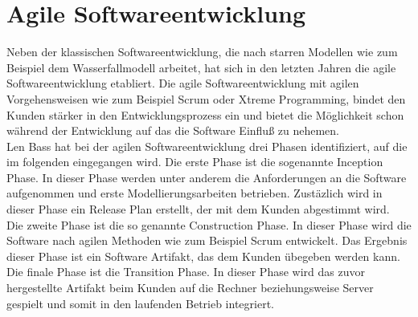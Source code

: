 \section{Agile Softwareentwicklung}
Neben der klassischen Softwareentwicklung, die nach starren Modellen wie zum Beispiel dem Wasserfallmodell arbeitet, hat sich in den letzten Jahren die agile Softwareentwicklung etabliert. Die agile Softwareentwicklung mit agilen Vorgehensweisen wie zum Beispiel Scrum oder Xtreme Programming, bindet den Kunden stärker in den Entwicklungsprozess ein und bietet die Möglichkeit schon während der Entwicklung auf das die Software Einfluß zu nehemen. \\
Len Bass hat bei der agilen Softwareentwicklung drei Phasen identifiziert, auf die im folgenden eingegangen wird. Die erste Phase ist die sogenannte Inception Phase. In dieser Phase werden unter anderem die Anforderungen an die Software aufgenommen und erste Modellierungsarbeiten betrieben. Zustäzlich wird in dieser Phase ein Release Plan erstellt, der mit dem Kunden abgestimmt wird.\\
Die zweite Phase ist die so genannte Construction Phase. In dieser Phase wird die Software nach agilen Methoden wie zum Beispiel Scrum entwickelt. Das Ergebnis dieser Phase ist ein Software Artifakt, das dem Kunden übegeben werden kann. \\
Die finale Phase ist die Transition Phase. In dieser Phase wird das zuvor hergestellte Artifakt beim Kunden auf die Rechner beziehungsweise Server gespielt und somit in den laufenden Betrieb integriert.

